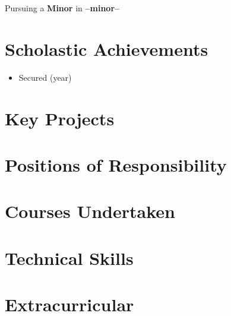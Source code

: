 \documentclass[10pt,a4paper]{article}
\begin{document}
\thispagestyle{empty}
\vspace*{6\baselineskip}
Pursuing a \textbf{Minor} in \textbf{--minor--}
\section*{Scholastic Achievements}
\begin{itemize}[itemsep=0.2pt]
	\item Secured \hfill (year)
\end{itemize}
\section*{Key Projects}
\section*{Positions of Responsibility}
\section*{Courses Undertaken}
\section*{Technical Skills}
\section*{Extracurricular}
\end{document}
